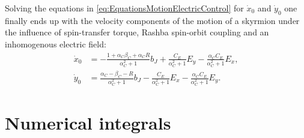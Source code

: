 \documentclass[12pt, a4paper, twoside, openright]{report}
\numberwithin{equation}{chapter}
\numberwithin{figure}{chapter}
\numberwithin{table}{chapter}
\begin{document}
Solving the equations in \eqref{eq:EquationsMotionElectricControl} for $\dot{x}_0$ and $\dot{y}_0$ one finally ends up with the velocity components of the motion of a skyrmion under the influence of spin-transfer torque, Rashba spin-orbit coupling and an inhomogenous electric field:
\begin{subequations}
\label{eq:ElectricalSkyrmionVComponents}
\begin{align}
\dot{x}_0 &= - \frac{1+\alpha_C\beta_C + \alpha_CR}{\alpha_C^2+1}b_J + \frac{C_E}{\alpha_C^2+1}E_y - \frac{\alpha_C C_E}{\alpha_C^2+1}E_x, \\
\dot{y}_0 &= \frac{\alpha_C-\beta_C - R}{\alpha_C^2+1}b_J - \frac{C_E}{\alpha_C^2+1}E_x - \frac{\alpha_C C_E}{\alpha_C^2+1}E_y.
\end{align}
\end{subequations}

\section{Numerical integrals}
\end{document}
